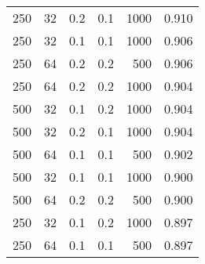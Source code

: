 \begin{table}[H]
\begin{tabular}{c|c|c|c|r|c}
    250                                & 32                             & 0.2                         & 0.1                                  & 1000                                & 0.910                  \\
    250                                & 32                             & 0.1                         & 0.1                                  & 1000                                & 0.906                  \\
    250                                & 64                             & 0.2                         & 0.2                                  & 500                                 & 0.906                  \\
    250                                & 64                             & 0.2                         & 0.2                                  & 1000                                & 0.904                  \\
    500                                & 32                             & 0.1                         & 0.2                                  & 1000                                & 0.904                  \\
    500                                & 32                             & 0.2                         & 0.1                                  & 1000                                & 0.904                  \\
    500                                & 64                             & 0.1                         & 0.1                                  & 500                                 & 0.902                  \\
    500                                & 32                             & 0.1                         & 0.1                                  & 1000                                & 0.900                  \\
    500                                & 64                             & 0.2                         & 0.2                                  & 500                                 & 0.900                  \\
    250                                & 32                             & 0.1                         & 0.2                                  & 1000                                & 0.897                  \\
    250                                & 64                             & 0.1                         & 0.1                                  & 500                                 & 0.897                  \\

\end{tabular}
\end{table}
